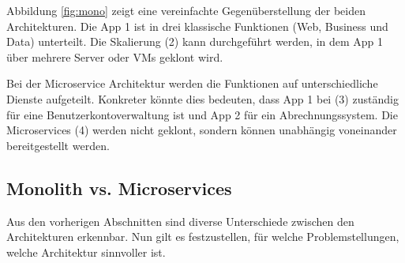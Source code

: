 Abbildung \ref{fig:mono} zeigt eine vereinfachte Gegenüberstellung der beiden Architekturen. Die App 1 ist in drei klassische Funktionen (Web, Business und Data) unterteilt. Die Skalierung (2) kann durchgeführt werden, in dem App 1 über mehrere Server oder VMs geklont wird. 

Bei der Microservice Architektur werden die Funktionen auf unterschiedliche Dienste aufgeteilt. Konkreter könnte dies bedeuten, dass App 1 bei (3) zuständig für eine Benutzerkontoverwaltung ist und App 2 für ein Abrechnungssystem. Die Microservices (4) werden nicht geklont, sondern können unabhängig voneinander bereitgestellt werden. 

\subsection{Monolith vs. Microservices}
Aus den vorherigen Abschnitten sind diverse Unterschiede zwischen den Architekturen erkennbar. Nun gilt es festzustellen, für welche Problemstellungen, welche Architektur sinnvoller ist. \cite{wolff2016mic_architectures} \cite{birk2016mic_soa}  


